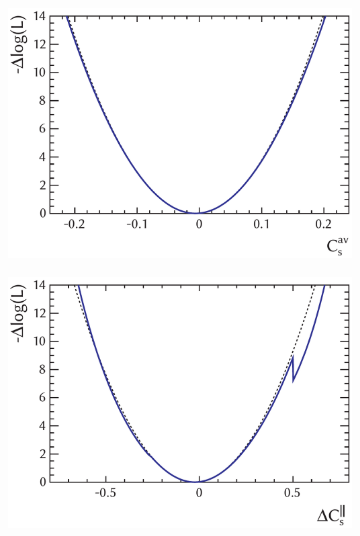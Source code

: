 \begin{figure}[tbp]
  \centering
  \begin{subfigure}{0.49\textwidth}
    \includegraphics[width=\textwidth]{graphics/results/NLL_polarDep_CCPAv}
    \caption{}
  \end{subfigure}
  \hfill%
  \begin{subfigure}{0.49\textwidth}
    \includegraphics[width=\textwidth]{graphics/results/NLL_polarDep_CCPRel_Apar}
    \caption{}
  \end{subfigure}


\end{figure}
